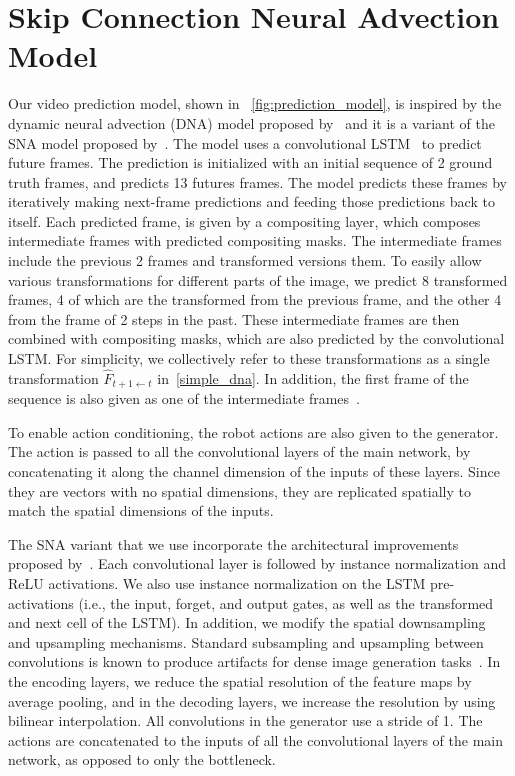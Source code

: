 \newpage

\section{Skip Connection Neural Advection Model}
\label{sec:skipcon}

Our video prediction model, shown in ~\autoref{fig:prediction_model}, is inspired by the dynamic neural advection (DNA) model proposed by~\cite{finn_nips} and it is a variant of the SNA model proposed by~\cite{sna}. The model uses a convolutional LSTM~\cite{convlstm} to predict future frames. The prediction is initialized with an initial sequence of 2 ground truth frames, and predicts 13 futures frames. The model predicts these frames by iteratively making next-frame predictions and feeding those predictions back to itself. Each predicted frame, is given by a compositing layer, which composes intermediate frames with predicted compositing masks. The intermediate frames include the previous 2 frames and transformed versions them. To easily allow various transformations for different parts of the image, we predict 8 transformed frames, 4 of which are the transformed from the previous frame, and the other 4 from the frame of 2 steps in the past. These intermediate frames are then combined with compositing masks, which are also predicted by the convolutional LSTM. For simplicity, we collectively refer to these transformations as a single transformation $\hat{F}_{t+1 \leftarrow t}$ in~\autoref{simple_dna}. In addition, the first frame of the sequence is also given as one of the intermediate frames~\cite{sna}.

To enable action conditioning, the robot actions are also given to the generator. The action is passed to all the convolutional layers of the main network, by concatenating it along the channel dimension of the inputs of these layers. Since they are vectors with no spatial dimensions, they are replicated spatially to match the spatial dimensions of the inputs.

The SNA variant that we use incorporate the architectural improvements proposed by~\cite{savp}. Each convolutional layer is followed by instance normalization \cite{instancenorm} and ReLU activations. We also use instance normalization on the LSTM pre-activations (i.e., the input, forget, and output gates, as well as the transformed and next cell of the LSTM). In addition, we modify the spatial downsampling and upsampling mechanisms. Standard subsampling and upsampling between convolutions is known to produce artifacts for dense image generation tasks~\cite{odena2016deconvolution,Niklaus_ICCV_2017}. In the encoding layers, we reduce the spatial resolution of the feature maps by average pooling, and in the decoding layers, we increase the resolution by using bilinear interpolation. All convolutions in the generator use a stride of 1. The actions are concatenated to the inputs of all the convolutional layers of the main network, as opposed to only the bottleneck.

